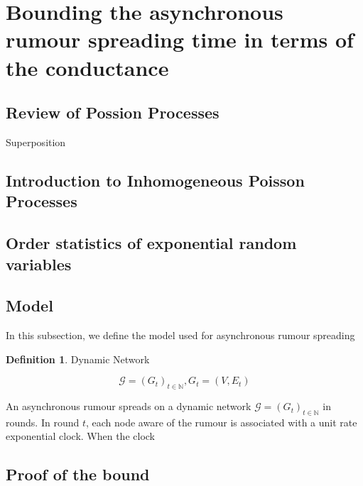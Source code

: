 \documentclass[a4paper,11pt]{article}
\theoremstyle{definition}
\newtheorem{definition}[theorem]{Definition}
\begin{document}



\section{Bounding the asynchronous rumour spreading time in terms of the conductance}

\subsection{Review of Possion Processes}

Superposition

\subsection{Introduction to Inhomogeneous Poisson Processes}

\subsection{Order statistics of exponential random variables}

\newcommand{\ModelIntro}{
	Let $\mathcal{G} = (G_t)_{t \in \mathbb{N}}$ be an $n$-node dynamic network, where one node is aware of a rumour in $G_0$.
}

\subsection{Model}

In this subsection, we define the model used for asynchronous rumour spreading

\begin{definition}
	Dynamic Network

	$$
		\mathcal{G} = (G_t)_{t \in \mathbb{N}}, G_t = (V, E_t)
	$$
\end{definition}



An asynchronous rumour spreads on a dynamic network $\mathcal{G} = (G_t)_{t\in \mathbb{N}}$ in rounds. In round $t$, each node aware of the rumour is associated with a unit rate exponential clock. When the clock 

\subsection{Proof of the bound}
\end{document}
